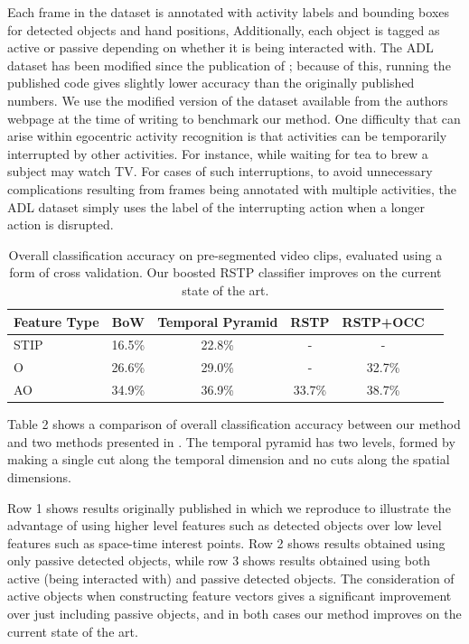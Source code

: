 \documentclass{bmvc2k}
\begin{document}
	Each frame in the dataset
	is annotated with activity labels and bounding boxes for detected objects and hand positions, 
	Additionally, each object is tagged as active or passive depending
	on whether it is being interacted with.
	The ADL dataset has been modified since the publication of
	\cite{Ramanan12}; because of this, running the published code gives
	slightly lower accuracy than the originally published numbers. We use the
  modified version of the dataset available from the authors webpage at the time of writing to
  benchmark our method. One difficulty that can arise within egocentric
  activity recognition is that activities can be temporarily interrupted by
  other activities. For instance, while waiting for tea to brew a subject
  may watch TV. For cases of such interruptions, to avoid unnecessary
  complications resulting from frames being annotated with multiple
  activities, the ADL dataset simply uses the label of the interrupting
  action when a longer action is disrupted.
	
	\begin{table}
		\begin{center}
			\begin{tabular}{|l|c|c|c|c|c|}
				\hline
        Feature Type & BoW & Temporal Pyramid & RSTP & RSTP+OCC \\
				\hline\hline
        STIP & 16.5\% & 22.8\% & - & - \\ 
        \hline
        O & 26.6\% & 29.0\% & - & 32.7\%\\
        \hline
        AO & 34.9\% & 36.9\% & 33.7\% & 38.7\%\\
				\hline
			\end{tabular}
		\end{center}
		\caption{Overall classification accuracy on pre-segmented video clips,
    evaluated using a form of cross validation. Our boosted RSTP classifier
  improves on the current state of the art.}
	\end{table}
	
  Table 2 shows a comparison of overall classification accuracy between our
  method and two methods presented in \cite{Ramanan12}. The temporal pyramid
  has two levels, formed by making a single cut along the temporal
  dimension and no cuts along the spatial dimensions.
  
  Row 1 shows results originally published in \cite{Ramanan12} which we
  reproduce to illustrate the advantage of using higher level features such
  as detected objects over low level features such as space-time interest
  points.  Row 2 shows results
  obtained using only passive detected objects, while row 3 shows results obtained
  using both active (being interacted with) and passive detected objects.
  The consideration of active objects when constructing feature vectors
  gives a significant improvement over just including passive objects, and
  in both cases our method improves on the current state of the art.
\end{document}
